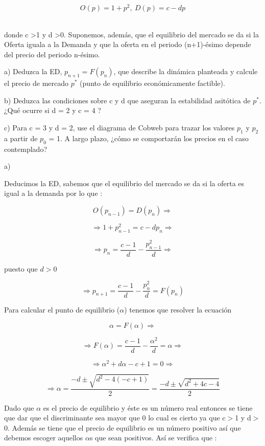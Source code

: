 \documentclass[11pt, a4paper]{article}
\newif\IfInSansMode
\numberwithin{equation}{section}
\theoremstyle{theorem-style}
\theoremstyle{definition-style}
\theoremstyle{remark-style}
\theoremstyle{example-style}
\begin{document}
    \[ 
        O(p) = 1 + p^{2}, \ D(p) = c - dp
    \]\

    donde c \textgreater 1 y d \textgreater 0. Suponemos, adem\'as, que el equilibrio del mercado se da si la Oferta iguala a la Demanda y que la oferta en el periodo (n+1)-\'esimo depende del precio del periodo n-\'esimo.

    a) Deduzca la ED, $p_{n+1} = F(p_n)$, que describe la din\'amica planteada y calcule el precio de mercado $p^{*}$ (punto de equilibrio econ\'omicamente factible).

    b) Deduzca las condiciones sobre c y d que aseguran la estabilidad asit\'otica de $p^{*}$. ¿Qu\'e ocurre si d = 2 y c = 4 ?

    c) Para c = 3 y d = 2, use el diagrama de Cobweb para trazar los valores $p_1$ y $p_2$ a partir de $p_0$ = 1. A largo plazo, ¿c\'omo se comportar\'an los precios en el caso contemplado?

    a)

    Deducimos la ED, sabemos que el equilibrio del mercado se da si la oferta es igual a la demanda por lo que :

    \[
        O(p_{n-1}) = D (p_n) \Rightarrow
    \]

    \[ 
        \Rightarrow 1 + p_{n-1}^{2} = c - dp_n \Rightarrow 
    \]

    \[ 
        \Rightarrow p_n = \frac{c-1}{d} - \frac{p_{n-1}^{2}}{d} \Rightarrow 
    \]

    puesto que $d>0$

    \[
        \Rightarrow p_{n+1} = \frac{c-1}{d} - \frac{p_{n}^{2}}{d} = F(p_n)
    \]

    Para calcular el punto de equilibrio ($\alpha$) tenemos que resolver la ecuaci\'on 

    \[
        \alpha = F(\alpha) \Rightarrow
    \]

    \[
        \Rightarrow F(\alpha) = \frac{c-1}{d} - \frac{\alpha^{2}}{d} = \alpha \Rightarrow
    \]

    \[
        \Rightarrow \alpha^{2} + d\alpha -c+1 = 0 \Rightarrow
    \]

    \[
        \Rightarrow \alpha = \frac{-d\pm\sqrt{d^{2} - 4(-c+1)}}{2} = \frac{-d\pm\sqrt{d^{2} +4c-4}}{2}
    \]

    Dado que $\alpha$ es el precio de equilibrio y \'este es un n\'umero real entonces se tiene que dar que el discriminante sea mayor que 0 lo cual es cierto ya que c$>$1 y d$>$0. Adem\'as se tiene que el precio de equilibrio es un n\'umero positivo así que debemos escoger aquellos $\alpha$s que sean positivos. As\'i se verifica que :
\end{document}
